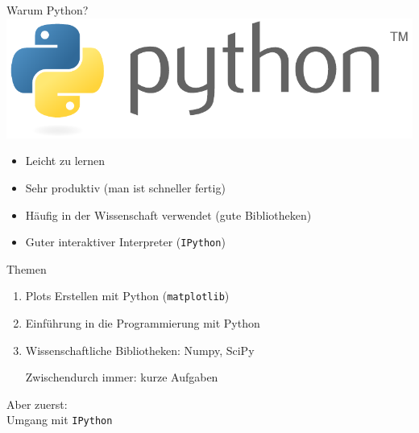 
\begin{frame}{Warum Python?}
  \includegraphics[width=\textwidth]{logos/python.pdf}
  \begin{itemize}
    \item Leicht zu lernen
    \item Sehr produktiv (man ist schneller fertig)
    \item Häufig in der Wissenschaft verwendet (gute Bibliotheken)
    \item Guter interaktiver Interpreter (\texttt{IPython})
  \end{itemize}
\end{frame}

\begin{frame}{Themen}
  \begin{enumerate}
    \item {\large Plots Erstellen mit Python (\texttt{matplotlib})}
    \item {\large Einführung in die Programmierung mit Python}
    \item {\large Wissenschaftliche Bibliotheken: Numpy, SciPy}

    Zwischendurch immer: kurze Aufgaben
  \end{enumerate}
\end{frame}

\begin{frame}
  \centering
  \Huge Aber zuerst:\\ Umgang mit \texttt{IPython}
\end{frame}
